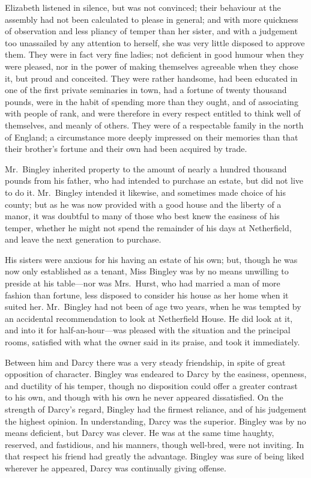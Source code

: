 \documentclass[12pt,english,oneside]{book}
\begin{document}
Elizabeth listened in silence, but was not convinced; their behaviour
at the assembly had not been calculated to please in general; and
with more quickness of observation and less pliancy of temper than
her sister, and with a judgement too unassailed by any attention to
herself, she was very little disposed to approve them. They were in
fact very fine ladies; not deficient in good humour when they were
pleased, nor in the power of making themselves agreeable when they
chose it, but proud and conceited. They were rather handsome, had
been educated in one of the first private seminaries in town, had
a fortune of twenty thousand pounds, were in the habit of spending
more than they ought, and of associating with people of rank, and
were therefore in every respect entitled to think well of themselves,
and meanly of others. They were of a respectable family in the north
of England; a circumstance more deeply impressed on their memories
than that their brother's fortune and their own had been acquired
by trade.

Mr.\ Bingley inherited property to the amount of nearly a hundred
thousand pounds from his father, who had intended to purchase an estate,
but did not live to do it. Mr.\ Bingley intended it likewise, and
sometimes made choice of his county; but as he was now provided with
a good house and the liberty of a manor, it was doubtful to many of
those who best knew the easiness of his temper, whether he might not
spend the remainder of his days at Netherfield, and leave the next
generation to purchase.

His sisters were anxious for his having an estate of his own; but,
though he was now only established as a tenant, Miss Bingley was by
no means unwilling to preside at his table\mbox{---}nor was Mrs.\ Hurst,
who had married a man of more fashion than fortune, less disposed
to consider his house as her home when it suited her. Mr.\ Bingley
had not been of age two years, when he was tempted by an accidental
recommendation to look at Netherfield House. He did look at it, and
into it for half-an-hour\mbox{---}was pleased with the situation
and the principal rooms, satisfied with what the owner said in its
praise, and took it immediately.

Between him and Darcy there was a very steady friendship, in spite
of great opposition of character. Bingley was endeared to Darcy by
the easiness, openness, and ductility of his temper, though no disposition
could offer a greater contrast to his own, and though with his own
he never appeared dissatisfied. On the strength of Darcy's regard,
Bingley had the firmest reliance, and of his judgement the highest
opinion. In understanding, Darcy was the superior. Bingley was by
no means deficient, but Darcy was clever. He was at the same time
haughty, reserved, and fastidious, and his manners, though well-bred,
were not inviting. In that respect his friend had greatly the advantage.
Bingley was sure of being liked wherever he appeared, Darcy was continually
giving offense.
\end{document}
